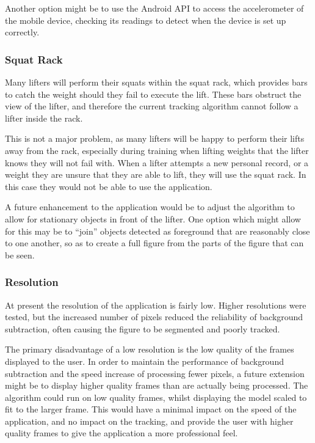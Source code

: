 Another option might be to use the Android API to access the accelerometer of the mobile device, checking its readings to detect when the device is set up correctly.

\subsubsection{Squat Rack}

Many lifters will perform their squats within the squat rack, which provides bars to catch the weight should they fail to execute the lift. These bars obstruct the view of the lifter, and therefore the current tracking algorithm cannot follow a lifter inside the rack.

This is not a major problem, as many lifters will be happy to perform their lifts away from the rack, especially during training when lifting weights that the lifter knows they will not fail with. When a lifter attempts a new personal record, or a weight they are unsure that they are able to lift, they will use the squat rack. In this case they would not be able to use the application.

A future enhancement to the application would be to adjust the algorithm to allow for stationary objects in front of the lifter. One option which might allow for this may be to ``join'' objects detected as foreground that are reasonably close to one another, so as to create a full figure from the parts of the figure that can be seen.

\subsubsection{Resolution}

At present the resolution of the application is fairly low. Higher resolutions were tested, but the increased number of pixels reduced the reliability of background subtraction, often causing the figure to be segmented and poorly tracked.

The primary disadvantage of a low resolution is the low quality of the frames displayed to the user. In order to maintain the performance of background subtraction and the speed increase of processing fewer pixels, a future extension might be to display higher quality frames than are actually being processed. The algorithm could run on low quality frames, whilst displaying the model scaled to fit to the larger frame. This would have a minimal impact on the speed of the application, and no impact on the tracking, and provide the user with higher quality frames to give the application a more professional feel.

